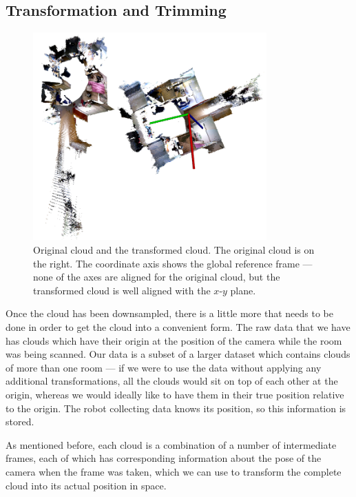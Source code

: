 \documentclass[11pt,a4paper]{kth-mag}
\begin{document}
\subsection{Transformation and Trimming}
\begin{figure}[t]
  \centering
  \includegraphics[width=0.8\textwidth]{images/orig_transformed}
  \caption{Original cloud and the transformed cloud. The original cloud
    is on the right. The coordinate axis shows the global reference frame ---
    none of the axes are aligned for the original cloud, but the transformed
    cloud is well aligned with the $x$-$y$ plane.}
  \label{fig:orig_transformed}
\end{figure}

Once the cloud has been downsampled, there is a little more that needs to be
done in order to get the cloud into a convenient form. The raw data that we have
has clouds which have their origin at the position of the camera while the room
was being scanned. Our data is a subset of a larger dataset which contains
clouds of more than one room --- if we were to use the data without applying any
additional transformations, all the clouds would sit on top of each other at the
origin, whereas we would ideally like to have them in their true position
relative to the origin. The robot collecting data knows its position, so this
information is stored.

As mentioned before, each cloud is a combination of a number of intermediate
frames, each of which has corresponding information about the pose of the camera
when the frame was taken, which we can use to transform the complete cloud into
its actual position in space.
\end{document}

